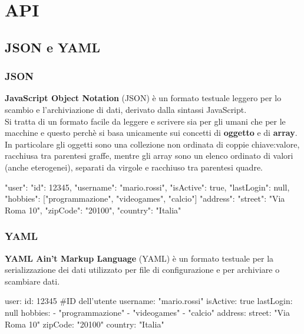 \documentclass[12pt]{article}
\begin{document}
\section{API}
\subsection{JSON e YAML}
\subsubsection{JSON}
\textbf{JavaScript Object Notation} (JSON) è un formato testuale leggero per lo scambio e l'archiviazione di dati, derivato dalla sintassi JavaScript.\\
Si tratta di un formato facile da leggere e scrivere sia per gli umani che per le macchine e questo perchè si basa unicamente sui concetti di \textbf{oggetto} e di \textbf{array}.\\
In particolare gli oggetti sono una collezione non ordinata di coppie chiave:valore, racchiusa tra parentesi graffe, mentre gli array sono un elenco ordinato di valori (anche eterogenei), separati da virgole e racchiuso tra parentesi quadre.
\begin{code}[language=JSON]
  {
    "user": {
      "id": 12345,
      "username": "mario.rossi",
      "isActive": true,
      "lastLogin": null,
      "hobbies": ["programmazione", "videogames", "calcio"]
      "address": {
        "street": "Via Roma 10",
        "zipCode": "20100",
        "country": "Italia"
      }
    }
  }
\end{code}
\subsubsection{YAML}
\textbf{YAML Ain't Markup Language} (YAML) è un formato testuale per la serializzazione dei dati utilizzato per file di configurazione e per archiviare o scambiare dati.
\begin{code}[language=YAML]
  user:
    id: 12345 #ID dell'utente
    username: "mario.rossi"
    isActive: true
    lastLogin: null
    hobbies:
      - "programmazione"
      - "videogames"
      - "calcio"
    address:
      street: "Via Roma 10"
      zipCode: "20100"
      country: "Italia"
\end{code}
\end{document}
